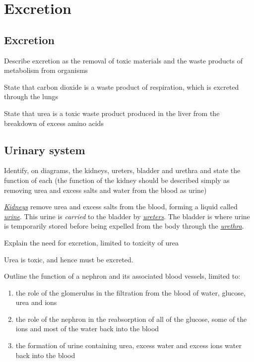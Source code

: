 \section{Excretion}
\subsection{Excretion}

\begin{point}
Describe excretion as the removal of toxic materials and the waste products of metabolism from 
organisms
\end{point}

\begin{point}
State that carbon dioxide is a waste product of respiration, which is excreted through the lungs
\end{point}


\begin{point}
State that urea is a toxic waste product produced in the liver from the breakdown of excess amino acids
\end{point}

\subsection{Urinary system}

\begin{point}
Identify, on diagrams, the kidneys, ureters, bladder and urethra and state the function of each (the 
function of the kidney should be described simply as removing urea and excess salts and water from the 
blood as urine)
\end{point}

\ul{\emph{Kidneys}} remove urea and excess salts from the blood, forming a liquid called 
\ul{\emph{urine}}. This urine is \emph{carried} to the bladder by 
\ul{\emph{ureters}}. The bladder is where urine is temporarily stored before being 
expelled from the body through the \ul{\emph{urethra}}.

\begin{point}
Explain the need for excretion, limited to toxicity of urea
\end{point}

Urea is toxic, and hence must be excreted.

\begin{point}
Outline the function of a nephron and its associated blood vessels, limited to:
\begin{enumerate}[label=(\alph*)]
	\setlength\itemsep{0em}
	\item the role of the glomerulus in the filtration from the blood of water, glucose, urea and ions
	\item the role of the nephron in the reabsorption of all of the glucose, some of the ions and most of the 
		water back into the blood
	\item the formation of urine containing urea, excess water and excess ions 
		water back into the blood
\end{enumerate}
\end{point}

